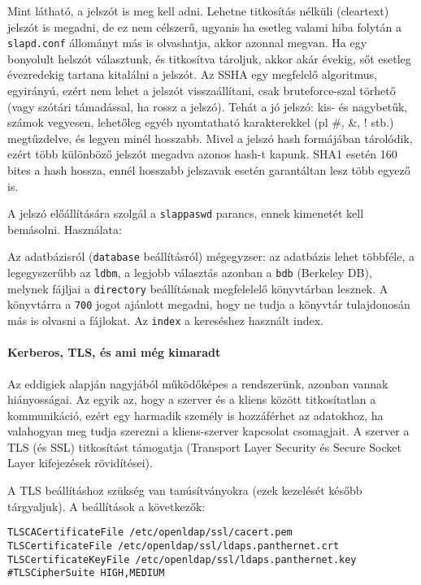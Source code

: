 Mint látható, a jelszót is meg kell adni. Lehetne titkosítás nélküli (cleartext) jelszót is megadni, de ez nem
célszerű, ugyanis ha esetleg valami hiba folytán a \texttt{slapd.conf} állományt más is olvashatja, akkor azonnal
megvan. Ha egy bonyolult helszót választunk, és titkosítva tároljuk, akkor akár évekig, sőt esetleg évezredekig
tartana kitalálni a jelszót. Az SSHA egy megfelelő algoritmus, egyirányú, ezért
nem lehet a jelszót visszaállítani, csak bruteforce-szal törhető (vagy szótári támadással, ha rossz a jelszó). Tehát a
jó jelszó: kis-  és nagybetűk, számok vegyesen, lehetőleg egyéb nyomtatható karakterekkel (pl \#, \&, ! stb.)
megtűzdelve, és legyen minél hosszabb. Mivel a jelszó hash formájában tárolódik, ezért több különböző jelszót megadva
azonos hash-t kapunk. SHA1 esetén 160 bites a hash hossza, ennél hosszabb jelszavak esetén garantáltan lesz több
egyező is.


A jelszó előállítására szolgál a \texttt{slappaswd} parancs, ennek kimenetét kell bemásolni. Használata:\\


Az adatbázisról (\texttt{database} beállításról) mégegyzser: az adatbázis lehet többféle, a legegyszerűbb az
\texttt{ldbm}, a legjobb választás azonban a  \texttt{bdb} (Berkeley DB), melynek fájljai a \texttt{directory}
beállításnak megfelelelő könyvtárban lesznek. A könyvtárra a \texttt{700} jogot ajánlott megadni, hogy ne tudja a
könyvtár tulajdonosán más is olvasni a fájlokat. Az  \texttt{index} a  kereséshez használt index.

\paragraph{Kerberos, TLS, és ami még kimaradt} Az eddigiek alapján nagyjából működőképes a rendszerünk, azonban vannak
hiányosságai. Az egyik az, hogy a szerver és a kliens között titkosítatlan a kommunikáció, ezért egy harmadik személy
is hozzáférhet az adatokhoz, ha valahogyan meg tudja szerezni a kliens-szerver kapcsolat csomagjait. A szerver a TLS
(és SSL) titkosítást támogatja (Transport Layer Security és Secure Socket Layer kifejezések rövidítései).

A TLS beállításhoz szükség van tanúsítványokra (ezek kezelését később tárgyaljuk). A beállítások a következők:

\begin{Verbatim}
TLSCACertificateFile /etc/openldap/ssl/cacert.pem
TLSCertificateFile /etc/openldap/ssl/ldaps.panthernet.crt
TLSCertificateKeyFile /etc/openldap/ssl/ldaps.panthernet.key
#TLSCipherSuite HIGH,MEDIUM
\end{Verbatim}  

